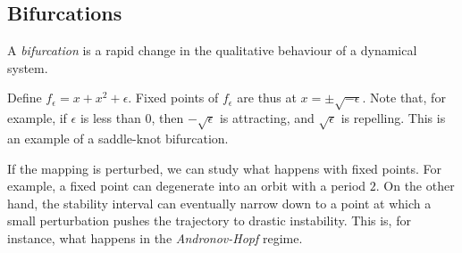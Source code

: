\documentclass[11pt]{scrartcl}
\begin{document}
\subsection{Bifurcations}

\begin{definition}
  A \textit{bifurcation} is a rapid change in the qualitative
  behaviour of a dynamical system.
\end{definition}

Define $f_{\epsilon} = x + x^{2} + \epsilon$. Fixed points of
$f_{\epsilon}$ are thus at $x = \pm \sqrt{-\epsilon}$. Note that, for
example, if $\epsilon$ is less than 0, then $-\sqrt{\epsilon}$ is
attracting, and $\sqrt{\epsilon}$ is repelling. This is an example of
a saddle-knot bifurcation.

If the mapping is perturbed, we can study what happens with fixed
points. For example, a fixed point can degenerate into an orbit with a
period $2$. On the other hand, the stability interval can eventually
narrow down to a point at which a small perturbation pushes the
trajectory to drastic instability. This is, for instance, what happens
in the \textit{Andronov-Hopf} regime.
\end{document}
